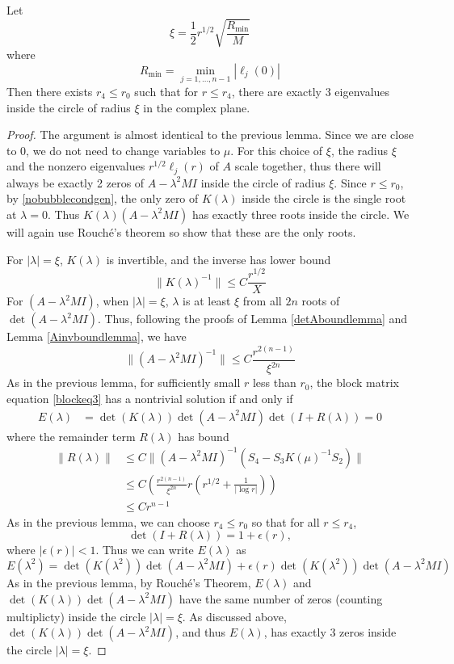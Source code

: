 \documentclass[thesis.tex]{subfiles}
\begin{document}
\begin{lemma}\label{eigcount2}
Let 
\begin{equation}\label{xiradius}
\xi = \frac{1}{2}r^{1/2} \sqrt{\frac{R_{\min}}{M}}
\end{equation}
where
\[
R_{\min} = \min_{j = 1, \dots, n-1} |\ell_j(0) |
\]
Then there exists $r_4 \leq r_0$ such that for $r \leq r_4$, there are exactly 3 eigenvalues inside the circle of radius $\xi$ in the complex plane.

\begin{proof}
The argument is almost identical to the previous lemma. Since we are close to 0, we do not need to change variables to $\mu$. For this choice of $\xi$, the radius $\xi$ and the nonzero eigenvalues $r^{1/2}\ell_j(r)$ of $A$ scale together, thus there will always be exactly 2 zeros of $A - \lambda^2 M I$ inside the circle of radius $\xi$. Since $r \leq r_0$, by \cref{nobubblecondgen}, the only zero of $K(\lambda)$ inside the circle is the single root at $\lambda = 0$. Thus $K(\lambda)(A - \lambda^2 M I)$ has exactly three roots inside the circle. We will again use Rouch\'e's theorem so show that these are the only roots.

For $|\lambda| = \xi$, $K(\lambda)$ is invertible, and the inverse has lower bound
\[
\| K(\lambda)^{-1}\| \leq C \frac{r^{1/2}}{X}
\]
For $(A - \lambda^2 M I)$, when $|\lambda| = \xi$, $\lambda$ is at least $\xi$ from all $2n$ roots of $\det(A - \lambda^2 M I)$. Thus, following the proofs of Lemma \ref{detAboundlemma} and Lemma \ref{Ainvboundlemma}, we have
\[
\| (A - \lambda^2 M I)^{-1} \| \leq C \frac{ r^{2(n-1)}}{\xi^{2n}} 
\]
As in the previous lemma, for sufficiently small $r$ less than $r_0$, the block matrix equation \cref{blockeq3} has a nontrivial solution if and only if 
\begin{align*}
E(\lambda) &= \det(K(\lambda))\det(A - \lambda^2 MI)\det(I + R(\lambda)) = 0
\end{align*}
where the remainder term $R(\lambda)$ has bound
\begin{align*}
\| R(\lambda) \| &\leq C \| (A - \lambda^2 MI)^{-1}(S_4 - S_3 K(
\mu)^{-1} S_2) \| \\
&\leq C \left( \frac{r^{2(n-1)}}{\xi^{2n}} r \left( r^{1/2} + \frac{1}{|\log r| } \right) \right) \\
&\leq C r^{n-1}
\end{align*}
As in the previous lemma, we can choose $r_4 \leq r_0$ so that for all $r \leq r_4$, 
\[
\det(I + R(\lambda)) = 1 + \epsilon(r),
\]
where $|\epsilon(r)| < 1$. Thus we can write $E(\lambda)$ as
\begin{equation}
E(\lambda^2) = \det(K(\lambda^2))\det(A - \lambda^2 MI) + \epsilon(r) \det(K(\lambda^2))\det(A - \lambda^2 MI)
\end{equation}
As in the previous lemma, by Rouch\'e's Theorem, $E(\lambda)$ and $\det(K(\lambda))\det(A - \lambda^2 MI)$ have the same number of zeros (counting multiplicty) inside the circle $|\lambda| = \xi$. As discussed above, $\det(K(\lambda))\det(A - \lambda^2 MI)$, and thus $E(\lambda)$, has exactly 3 zeros inside the circle $|\lambda| = \xi$.
\end{proof}
\end{lemma}
\end{document}
